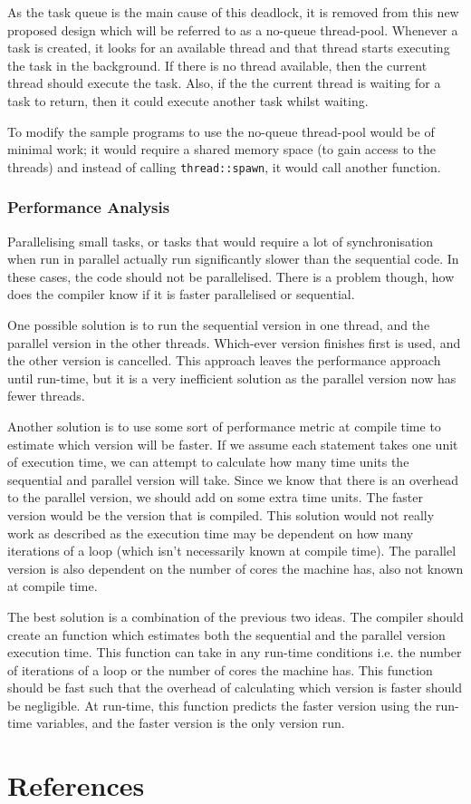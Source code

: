 \documentclass[conference]{IEEEtran}
\begin{document}

As the task queue is the main cause of this deadlock, it is removed from this new proposed design which will be referred to as a no-queue thread-pool. Whenever a task is created, it looks for an available thread and that thread starts executing the task in the background. If there is no thread available, then the current thread should execute the task. Also, if the the current thread is waiting for a task to return, then it could execute another task whilst waiting.

To modify the sample programs to use the no-queue thread-pool would be of minimal work; it would require a shared memory space (to gain access to the threads) and instead of calling \texttt{thread::spawn}, it would call another function.

\subsubsection{Performance Analysis}
Parallelising small tasks, or tasks that would require a lot of synchronisation when run in parallel actually run significantly slower than the sequential code. In these cases, the code should not be parallelised. There is a problem though, how does the compiler know if it is faster parallelised or sequential.

One possible solution is to run the sequential version in one thread, and the parallel version in the other threads. Which-ever version finishes first is used, and the other version is cancelled. This approach leaves the performance approach until run-time, but it is a very inefficient solution as the parallel version now has fewer threads.

Another solution is to use some sort of performance metric at compile time to estimate which version will be faster. If we assume each statement takes one unit of execution time, we can attempt to calculate how many time units the sequential and parallel version will take. Since we know that there is an overhead to the parallel version, we should add on some extra time units. The faster version would be the version that is compiled. This solution would not really work as described as the execution time may be dependent on how many iterations of a loop (which isn't necessarily known at compile time). The parallel version is also dependent on the number of cores the machine has, also not known at compile time.

The best solution is a combination of the previous two ideas. The compiler should create an function which estimates both the sequential and the parallel version execution time. This function can take in any run-time conditions i.e. the number of iterations of a loop or the number of cores the machine has. This function should be fast such that the overhead of calculating which version is faster should be negligible. At run-time, this function predicts the faster version using the run-time variables, and the faster version is the only version run.

\section{References}
\printbibliography[heading=none]
\end{document}
